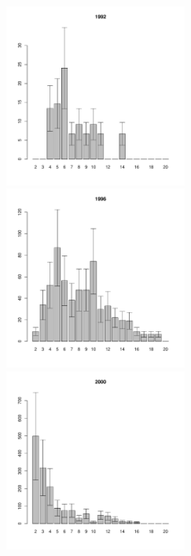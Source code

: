 \documentclass[12pt, a4paper]{article}
\begin{document}
\newpage \begin{figure}[h] 

\begin{multicols}{3}
\hfill
\includegraphics[width=60mm]{../White_Sea/Luvenga_II_razrez/fucus_zone2_1992_.pdf}
\hfill
\includegraphics[width=60mm]{../White_Sea/Luvenga_II_razrez/fucus_zone2_1996_.pdf}
\hfill
\includegraphics[width=60mm]{../White_Sea/Luvenga_II_razrez/fucus_zone2_2000_.pdf}
\end{multicols}




\end{figure}
\end{document}

